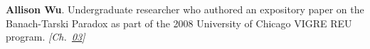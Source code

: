 \textbf{Allison Wu}. Undergraduate researcher who authored an expository paper on the Banach-Tarski Paradox as part of the 2008 University of Chicago VIGRE REU program. \emph{[Ch.~\hyperref[ch:banach]{03}]}

